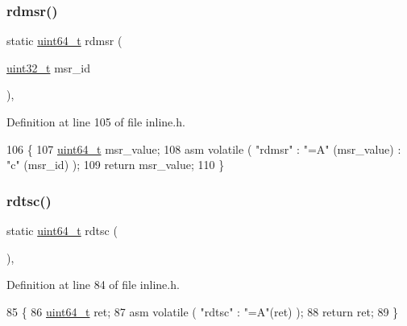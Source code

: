 \subsubsection{\texorpdfstring{rdmsr()}{rdmsr()}}
{\footnotesize\ttfamily static \hyperlink{a00068_aa232ecf786a74ce5363c36c10798d2b1_aa232ecf786a74ce5363c36c10798d2b1}{uint64\+\_\+t} rdmsr (\begin{DoxyParamCaption}\item[{\hyperlink{a00068_a435d1572bf3f880d55459d9805097f62_a435d1572bf3f880d55459d9805097f62}{uint32\+\_\+t}}]{msr\+\_\+id }\end{DoxyParamCaption})\hspace{0.3cm}{\ttfamily [inline]}, {\ttfamily [static]}}



Definition at line 105 of file inline.\+h.


\begin{DoxyCode}
106 \{
107     \hyperlink{a00068_aa232ecf786a74ce5363c36c10798d2b1_aa232ecf786a74ce5363c36c10798d2b1}{uint64\_t} msr\_value;
108     \textcolor{keyword}{asm} \textcolor{keyword}{volatile} ( \textcolor{stringliteral}{"rdmsr"} : \textcolor{stringliteral}{"=A"} (msr\_value) : \textcolor{stringliteral}{"c"} (msr\_id) );
109     \textcolor{keywordflow}{return} msr\_value;
110 \}
\end{DoxyCode}
\mbox{\label{a00077_a47b9d70be3022fd0b5687d9794ca47bc_a47b9d70be3022fd0b5687d9794ca47bc}} 
\subsubsection{\texorpdfstring{rdtsc()}{rdtsc()}}
{\footnotesize\ttfamily static \hyperlink{a00068_aa232ecf786a74ce5363c36c10798d2b1_aa232ecf786a74ce5363c36c10798d2b1}{uint64\+\_\+t} rdtsc (\begin{DoxyParamCaption}{ }\end{DoxyParamCaption})\hspace{0.3cm}{\ttfamily [inline]}, {\ttfamily [static]}}



Definition at line 84 of file inline.\+h.


\begin{DoxyCode}
85 \{
86     \hyperlink{a00068_aa232ecf786a74ce5363c36c10798d2b1_aa232ecf786a74ce5363c36c10798d2b1}{uint64\_t} ret;
87     \textcolor{keyword}{asm} \textcolor{keyword}{volatile} ( \textcolor{stringliteral}{"rdtsc"} : \textcolor{stringliteral}{"=A"}(ret) );
88     \textcolor{keywordflow}{return} ret;
89 \}
\end{DoxyCode}
\mbox{\label{a00077_ac85e095222f364961e091702bb6bc2ff_ac85e095222f364961e091702bb6bc2ff}} 
